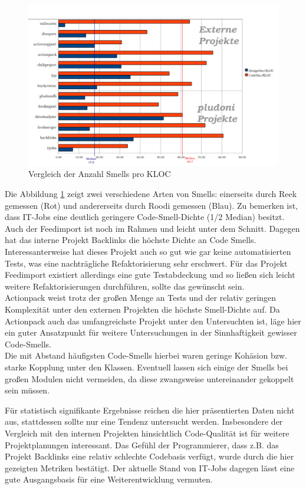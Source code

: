 \begin{figure}[htbp]
 \centering
 \includegraphics[width=\linewidth]{./diagrams/cpm-smells.pdf}
 \caption{Vergleich der Anzahl Smells pro KLOC}
 \label{fig:cpm-smells}
\end{figure}
Die Abbildung \ref{fig:cpm-smells} zeigt zwei verschiedene Arten von Smells: einerseits durch Reek gemessen (Rot) und andererseits durch Roodi gemessen (Blau). Zu bemerken ist, dass IT-Jobs eine deutlich geringere Code-Smell-Dichte (1/2 Median) besitzt. Auch der Feedimport ist noch im Rahmen und leicht unter dem Schnitt. Dagegen hat das interne Projekt Backlinks die höchste Dichte an Code Smells. Interessanterweise hat dieses Projekt auch so gut wie gar keine automatisierten Tests, was eine nachträgliche Refaktorisierung sehr erschwert. Für das Projekt Feedimport existiert allerdings eine gute Testabdeckung und so ließen sich leicht weitere Refaktorisierungen durchführen, sollte das gewünscht sein. \\
Actionpack weist trotz der großen Menge an Tests und der relativ geringen Komplexität unter den externen Projekten die höchste Smell-Dichte auf. Da Actionpack auch das umfangreichste Projekt unter den Untersuchten ist, läge hier ein guter Ansatzpunkt für weitere Untersuchungen in der Sinnhaftigkeit gewisser Code-Smells. \\
Die mit Abstand häufigsten Code-Smells hierbei waren geringe Kohäsion bzw. starke Kopplung unter den Klassen. Eventuell lassen sich einige der Smells bei großen Modulen nicht vermeiden, da diese zwangsweise untereinander gekoppelt sein müssen.

Für statistisch signifikante Ergebnisse reichen die hier präsentierten Daten nicht aus, stattdessen sollte nur eine Tendenz untersucht werden. Insbesondere der Vergleich mit den internen Projekten hinsichtlich Code-Qualität ist für weitere Projektplanungen interessant. Das Gefühl der Programmierer, dass z.B. das Projekt Backlinks eine relativ schlechte Codebasis verfügt, wurde durch die hier gezeigten Metriken bestätigt. Der aktuelle Stand von IT-Jobs dagegen lässt eine gute Ausgangsbasis für eine Weiterentwicklung vermuten.


